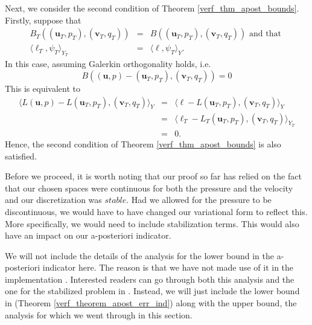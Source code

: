 \documentclass[12pt,a4paper]{article}
\theoremstyle{definition}
\begin{document}
Next, we consider the second condition of Theorem \ref{verf_thm_apost_bounds}.  Firstly, suppose that
\begin{eqnarray}
B_T\left(\left(\textbf{u}_T,p_T\right),\left(\textbf{v}_T,q_T\right)\right)&=&B\left(\left(\textbf{u}_T,p_T\right),\left(\textbf{v}_T,q_T\right)\right)\text{ and that }\\
\langle \ell_T,\psi_T \rangle_{Y_T}&=&\langle \ell,\psi_T \rangle_{Y}.
\end{eqnarray}
In this case, assuming Galerkin orthogonality holds, i.e.
\begin{equation}
B\left(\left(\textbf{u},p\right)-\left(\textbf{u}_T,p_T\right),\left(\textbf{v}_T,q_T\right)\right) = 0
\end{equation} 
This is equivalent to 
\begin{eqnarray}
\langle L\left(\textbf{u},p\right)-L\left(\textbf{u}_T,p_T\right),\left(\textbf{v}_T,q_T\right)\rangle_Y&=&\langle \ell - L\left(\textbf{u}_T,p_T\right),\left(\textbf{v}_T,q_T\right) \rangle_Y\nonumber\\
&=&\langle \ell_T - L_T\left(\textbf{u}_T,p_T\right),\left(\textbf{v}_T,q_T\right) \rangle_{Y_T}\nonumber\\
&=&0.\nonumber
\end{eqnarray}
Hence, the second condition of Theorem \ref{verf_thm_apost_bounds} is also satisfied.  

Before we proceed, it is worth noting that our proof so far has relied on the fact that our chosen spaces were continuous for both the pressure and the velocity and our discretization was $\textit{stable}$.   Had we allowed for the pressure to be discontinuous, we would have to have changed our variational form to reflect this.  More specifically, we would need to include stabilization terms.  This would also have an impact on our a-posteriori indicator.

We will not include the details of the analysis for the lower bound in the a-posteriori indicator here.  The reason is that we have not made use of it in the implementation .  Interested readers can go through both this analysis and the one for the stabilized problem in \cite[\S 4.10.3]{verfurth2013posteriori}.  Instead, we will just include the lower bound in (Theorem \ref{verf_theorem_apost_err_ind}) along with the upper bound, the analysis for which we went through in this section.
\end{document}
